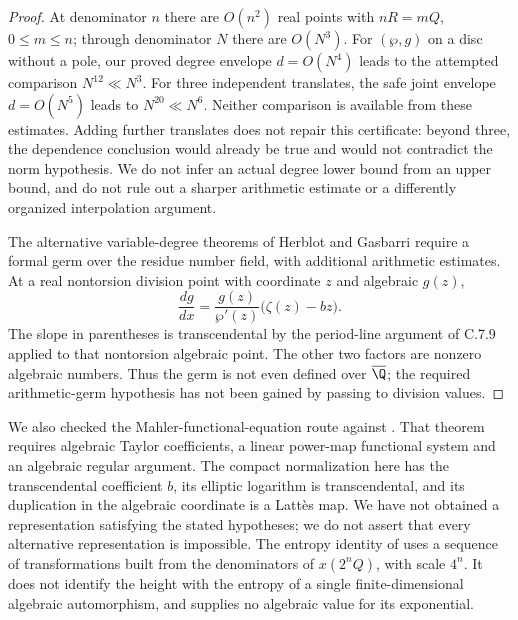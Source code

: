 \begin{proof}
At denominator $n$ there are $O(n^2)$ real points with
$nR=mQ$, $0\leq m\leq n$; through denominator $N$ there are
$O(N^3)$.  For $(\wp,g)$ on a disc without a pole, our proved
degree envelope $d=O(N^4)$ leads to the attempted comparison
$N^{12}\ll N^3$.  For three independent translates, the
safe joint envelope $d=O(N^5)$ leads to
$N^{20}\ll N^6$.  Neither comparison is available from
these estimates.  Adding further translates does not repair
this certificate: beyond three, the dependence conclusion
would already be true and would not contradict the norm
hypothesis.  We do not infer an actual degree lower bound
from an upper bound, and do not rule out a sharper arithmetic
estimate or a differently organized interpolation argument.

The alternative variable-degree theorems of Herblot and
Gasbarri require a formal germ over the residue number field,
with additional arithmetic estimates.  At a real nontorsion
division point with coordinate $z$ and algebraic $g(z)$,
\[
 \frac{dg}{dx}=\frac{g(z)}{\wp'(z)}
                         \bigl(\zeta(z)-bz\bigr).
\]
The slope in parentheses is transcendental by the period-line
argument of C.7.9 applied to that nontorsion algebraic point.
The other two factors are nonzero algebraic numbers.
Thus the germ is not even defined over $\overline\Q$;
the required arithmetic-germ hypothesis has not been gained
by passing to division values.
\end{proof}

We also checked the Mahler-functional-equation route against
\citet[Theorem 1.1 and system (1.2)]{adamczewski2017mahler}.
That theorem requires algebraic Taylor coefficients, a linear
power-map functional system and an algebraic regular argument.
The compact normalization here has the transcendental coefficient
$b$, its elliptic logarithm is transcendental, and its duplication
in the algebraic coordinate is a Latt\`es map.  We have not obtained
a representation satisfying the stated hypotheses; we do not
assert that every alternative representation is impossible.
The entropy identity of
\citet[Theorem 5.1]{einsiedler2001entropy} uses a sequence of
transformations built from the denominators of $x(2^nQ)$,
with scale $4^n$.  It does not identify the height with the
entropy of a single finite-dimensional algebraic automorphism,
and supplies no algebraic value for its exponential.

